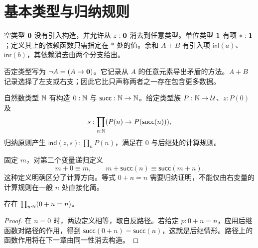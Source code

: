 \section{基本类型与归纳规则}
\begin{definition}
空类型 $\mathbf 0$ 没有引入构造，并允许从 $z:\mathbf 0$ 消去到任意类型。单位类型 $\mathbf 1$ 有项 $*:\mathbf 1$；定义其上的依赖函数只需指定在 $*$ 处的值。余和 $A+B$ 有引入项 $\mathsf{inl}(a)$、$\mathsf{inr}(b)$，其依赖消去由两个分支给出。
\end{definition}
\begin{example}
否定类型写为 $\neg A=(A\to\mathbf 0)$。它记录从 $A$ 的任意元素导出矛盾的方法。$A+B$ 记录选择了左支或右支；因此它比只声称两者之一存在包含更多数据。
\end{example}
\begin{definition}[自然数类型]
自然数类型 $\mathbb N$ 有构造 $0:\mathbb N$ 与 $\mathsf{succ}:\mathbb N\to\mathbb N$。给定类型族 $P:\mathbb N\to\mathcal U$、$z:P(0)$ 及
\[
s:\prod_{n:\mathbb N}(P(n)\to P(\mathsf{succ}(n))),
\]
归纳原则产生 $\mathsf{ind}(z,s):\prod_nP(n)$，满足在 $0$ 与后继处的计算规则。
\end{definition}
\begin{example}[递归定义加法]
固定 $m$，对第二个变量递归定义
\[
m+0\equiv m,
\qquad m+\mathsf{succ}(n)\equiv\mathsf{succ}(m+n).
\]
这种定义明确区分了计算方向。等式 $0+n=n$ 需要归纳证明，不能仅由右变量的计算规则在一般 $n$ 处直接化简。
\end{example}
\begin{proposition}[加法的左单位]
存在 $\prod_{n:\mathbb N}(0+n=n)$。
\end{proposition}
\begin{proof}
在 $n=0$ 时，两边定义相等，取自反路径。若给定 $p:0+n=n$，应用后继函数对路径的作用，得到
$\mathsf{succ}(0+n)=\mathsf{succ}(n)$，这就是后继情形。路径上的函数作用将在下一章由同一性消去构造。
\end{proof}

